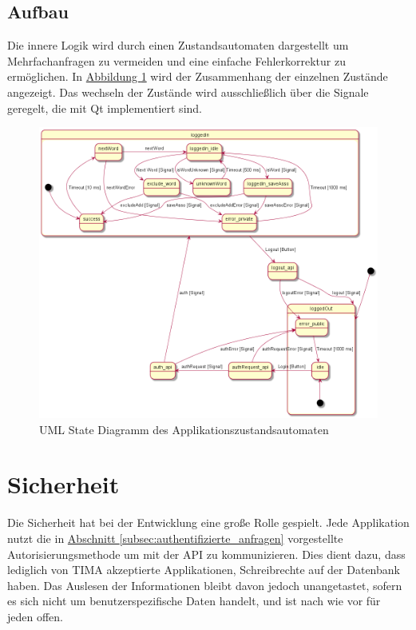 \subsection{Aufbau}
Die innere Logik wird durch einen Zustandsautomaten dargestellt um
Mehrfachanfragen zu vermeiden und eine einfache Fehlerkorrektur zu ermöglichen.
In \hyperref[fig:uml_automata]{Abbildung \ref*{fig:uml_automata}} wird der Zusammenhang der einzelnen
Zustände angezeigt. Das wechseln der Zustände wird ausschließlich über die
Signale geregelt, die mit Qt implementiert sind.
\begin{figure}[!h]
	\centering
	\includegraphics[width=\textwidth]{../UML/app_automata.png}
	\caption{UML State Diagramm des Applikationszustandsautomaten}
	\label{fig:uml_automata}
\end{figure}

\section{Sicherheit}
Die Sicherheit hat bei der Entwicklung eine große Rolle gespielt. Jede Applikation nutzt die in \hyperref[subsec:authentifizierte_anfragen]{Abschnitt \ref*{subsec:authentifizierte_anfragen}} vorgestellte Autorisierungsmethode um  mit der API zu kommunizieren.  Dies dient dazu, dass lediglich von TIMA
akzeptierte Applikationen, Schreibrechte auf der Datenbank haben. Das Auslesen
der Informationen bleibt davon jedoch unangetastet, sofern es sich nicht um benutzerspezifische Daten handelt, und ist nach wie vor für
jeden offen.
